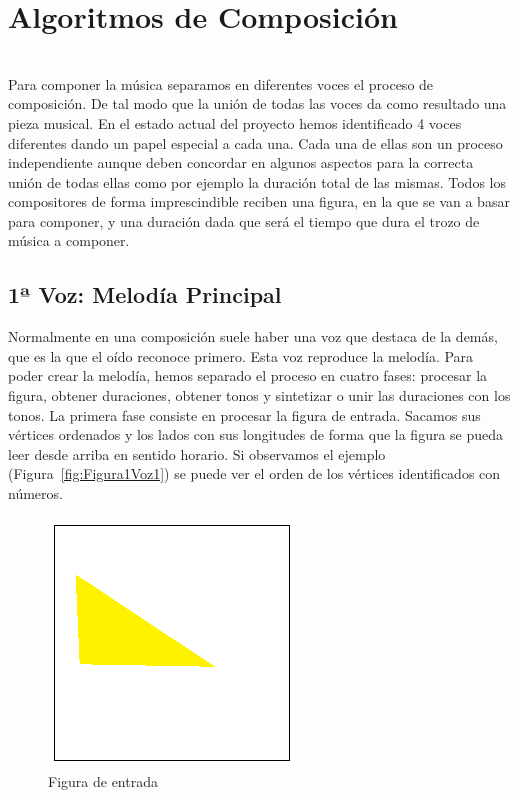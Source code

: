 \section{Algoritmos de Composición}
\label{sec:algComposicion}

\\

Para componer la música separamos en diferentes voces el proceso de composición. De tal modo que la unión de todas las voces da como resultado una pieza musical. En el estado actual del proyecto hemos identificado 4 voces diferentes dando un papel especial a cada una. Cada una de ellas son un proceso independiente aunque deben concordar en algunos aspectos para la correcta unión de todas ellas como por ejemplo la duración total de las mismas. Todos los compositores de forma imprescindible reciben una figura, en la que se van a basar para componer, y una duración dada que será el tiempo que dura el trozo de música a componer.

\subsection{1ª Voz: Melodía Principal}

Normalmente en una composición suele haber una voz que destaca de la demás, que es la que el oído reconoce primero. Esta voz reproduce la melodía. Para poder crear la melodía, hemos separado el proceso en cuatro fases: procesar la figura, obtener duraciones, obtener tonos y sintetizar o unir las duraciones con los tonos. 
La primera fase consiste en procesar la figura de entrada. Sacamos sus vértices ordenados y los lados con sus longitudes de forma que la figura se pueda leer desde arriba en sentido horario. Si observamos el ejemplo (Figura~\ref{fig:Figura1Voz1}) se puede ver el orden de los vértices identificados con números.

		\begin{figure}[htbp]
		\centering
		\hspace*{0.0in}
		\includegraphics[scale=1.0]{graphics/simpletest1.png}
		\caption{Figura de entrada}
		\label{fig:Figura0Voz1}
		\end{figure}

